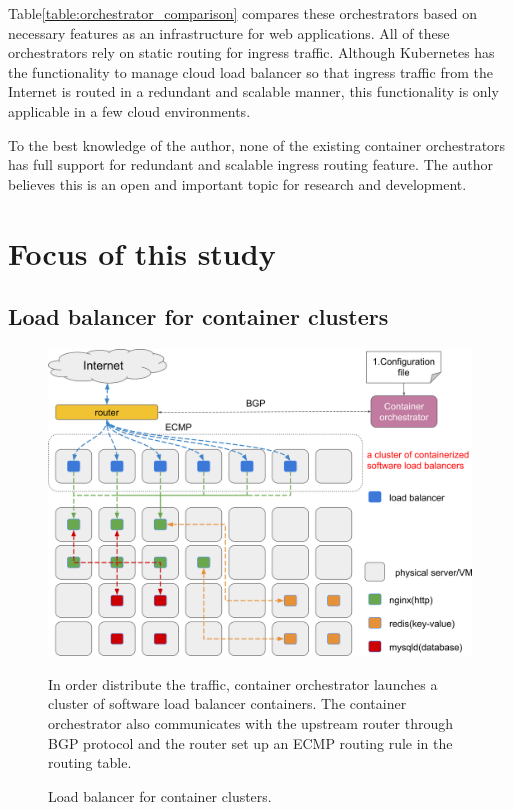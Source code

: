 Table\ref{table:orchestrator_comparison} compares these orchestrators based on necessary features as an infrastructure for web applications.
All of these orchestrators rely on static routing for ingress traffic.
Although Kubernetes has the functionality to manage cloud load balancer so that ingress traffic from the Internet is routed in a redundant and scalable manner, this functionality is only applicable in a few cloud environments.

To the best knowledge of the author, none of the existing container orchestrators has full support for redundant and scalable ingress routing feature.
The author believes this is an open and important topic for research and development.

\section{Focus of this study}

\subsection{Load balancer for container clusters}

\begin{figure}[h]
\begin{center}
\includegraphics[width=0.9\columnwidth]{Figs/cluster_of_container_loadbalancer}
\end{center}
\caption{
Load balancer for container clusters.
}
\centering\parbox[c]{0.9\columnwidth}{
In order distribute the traffic, container orchestrator launches a cluster of software load balancer containers. 
The container orchestrator also communicates with the upstream router through BGP protocol and the router set up an ECMP routing rule in the routing table.
}
\label{fig:cluster_of_container_loadbalancer}
\end{figure}

